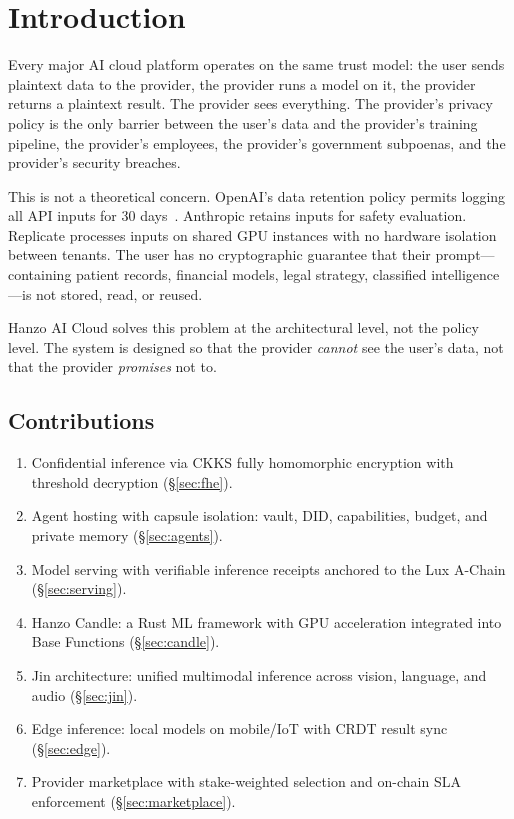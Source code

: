 \section{Introduction}

\label{sec:intro}

Every major AI cloud platform operates on the same trust model: the user sends
plaintext data to the provider, the provider runs a model on it, the provider
returns a plaintext result. The provider sees everything. The provider's
privacy policy is the only barrier between the user's data and the provider's
training pipeline, the provider's employees, the provider's government
subpoenas, and the provider's security breaches.

This is not a theoretical concern. OpenAI's data retention policy permits
logging all API inputs for 30 days~\cite{openaiapi}. Anthropic retains inputs
for safety evaluation. Replicate processes inputs on shared GPU instances with
no hardware isolation between tenants. The user has no cryptographic guarantee
that their prompt---containing patient records, financial models, legal
strategy, classified intelligence---is not stored, read, or reused.

Hanzo AI Cloud solves this problem at the architectural level, not the policy
level. The system is designed so that the provider \emph{cannot} see the
user's data, not that the provider \emph{promises} not to.

\subsection{Contributions}

\begin{enumerate}[leftmargin=1.4em]
    \item Confidential inference via CKKS fully homomorphic encryption with
    threshold decryption (\S\ref{sec:fhe}).
    \item Agent hosting with capsule isolation: vault, DID, capabilities,
    budget, and private memory (\S\ref{sec:agents}).
    \item Model serving with verifiable inference receipts anchored to the
    Lux A-Chain (\S\ref{sec:serving}).
    \item Hanzo Candle: a Rust ML framework with GPU acceleration integrated
    into Base Functions (\S\ref{sec:candle}).
    \item Jin architecture: unified multimodal inference across vision,
    language, and audio (\S\ref{sec:jin}).
    \item Edge inference: local models on mobile/IoT with CRDT result sync
    (\S\ref{sec:edge}).
    \item Provider marketplace with stake-weighted selection and on-chain SLA
    enforcement (\S\ref{sec:marketplace}).
\end{enumerate}

